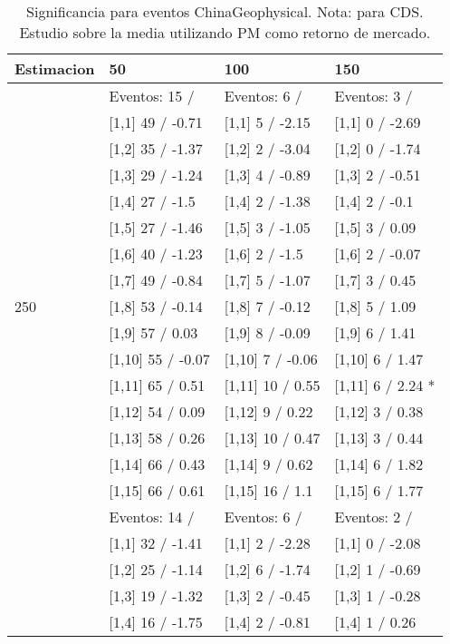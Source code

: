 \begin{table}

\caption{Significancia para eventos ChinaGeophysical. Nota: para CDS. Estudio sobre la media utilizando PM como retorno de mercado.}
\centering
\begin{tabular}[t]{llll}
\toprule
Estimacion & 50 & 100 & 150\\
\midrule
 & Eventos:  15 / & Eventos:  6 / & Eventos:  3 /\\
 & {}[1,1] 49  / -0.71 & {}[1,1] 5  / -2.15 & {}[1,1] 0  / -2.69\\
 & {}[1,2] 35  / -1.37 & {}[1,2] 2  / -3.04 & {}[1,2] 0  / -1.74\\
 & {}[1,3] 29  / -1.24 & {}[1,3] 4  / -0.89 & {}[1,3] 2  / -0.51\\
 & {}[1,4] 27  / -1.5 & {}[1,4] 2  / -1.38 & {}[1,4] 2  / -0.1\\
\addlinespace
 & {}[1,5] 27  / -1.46 & {}[1,5] 3  / -1.05 & {}[1,5] 3  / 0.09\\
 & {}[1,6] 40  / -1.23 & {}[1,6] 2  / -1.5 & {}[1,6] 2  / -0.07\\
 & {}[1,7] 49  / -0.84 & {}[1,7] 5  / -1.07 & {}[1,7] 3  / 0.45\\
250 & {}[1,8] 53  / -0.14 & {}[1,8] 7  / -0.12 & {}[1,8] 5  / 1.09\\
 & {}[1,9] 57  / 0.03 & {}[1,9] 8  / -0.09 & {}[1,9] 6  / 1.41\\
\addlinespace
 & {}[1,10] 55  / -0.07 & {}[1,10] 7  / -0.06 & {}[1,10] 6  / 1.47\\
 & {}[1,11] 65  / 0.51 & {}[1,11] 10  / 0.55 & {}[1,11] 6  / 2.24 *\\
 & {}[1,12] 54  / 0.09 & {}[1,12] 9  / 0.22 & {}[1,12] 3  / 0.38\\
 & {}[1,13] 58  / 0.26 & {}[1,13] 10  / 0.47 & {}[1,13] 3  / 0.44\\
 & {}[1,14] 66  / 0.43 & {}[1,14] 9  / 0.62 & {}[1,14] 6  / 1.82\\
\addlinespace
 & {}[1,15] 66  / 0.61 & {}[1,15] 16  / 1.1 & {}[1,15] 6  / 1.77\\
 & Eventos:  14 / & Eventos:  6 / & Eventos:  2 /\\
 & {}[1,1] 32  / -1.41 & {}[1,1] 2  / -2.28 & {}[1,1] 0  / -2.08\\
 & {}[1,2] 25  / -1.14 & {}[1,2] 6  / -1.74 & {}[1,2] 1  / -0.69\\
 & {}[1,3] 19  / -1.32 & {}[1,3] 2  / -0.45 & {}[1,3] 1  / -0.28\\
\addlinespace
 & {}[1,4] 16  / -1.75 & {}[1,4] 2  / -0.81 & {}[1,4] 1  / 0.26\\

\end{tabular}
\end{table}

